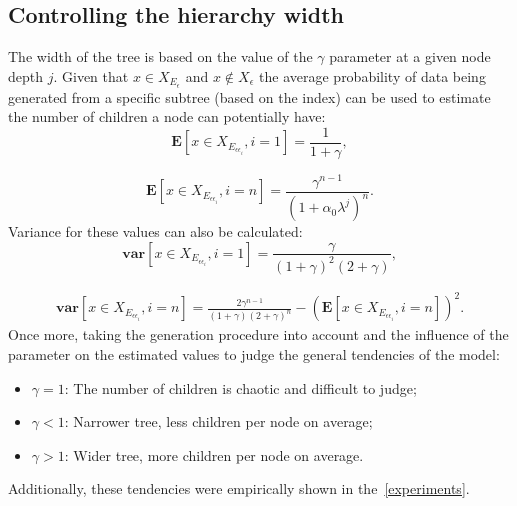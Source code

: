 \documentclass{article}
\begin{document}
    \subsection{Controlling the hierarchy width}
    The width of the tree is based on the value of the $\gamma$ parameter at a given node depth $j$. Given that 
    $x \in X_{E_\epsilon}$ and $x \not \in X_\epsilon$ the average probability of data being generated from a specific subtree (based on the index) can be used to estimate the number of children a node can potentially have:
    \begin{equation}
    \mathbf{E}[x \in X_{E_{\epsilon\epsilon_i}}, i = 1] = \frac{1}{1 + \gamma},
    \end{equation}
	
    \begin{equation}
    \mathbf{E}[x \in X_{E_{\epsilon\epsilon_i}}, i = n] = \frac{\gamma^{n-1}}{(1 + \alpha_0\lambda^j)^n}.
    \end{equation}
	Variance for these values can also be calculated:
    \begin{equation}
	\mathbf{var}[x \in X_{E_{\epsilon\epsilon_i}}, i = 1] = \frac{\gamma}{(1 + \gamma)^2(2 + \gamma)},
	\end{equation}
	
    \begin{equation}
	\begin{multlined}
	\mathbf{var}[x \in X_{E_{\epsilon\epsilon_i}}, i = n] = \frac{2 \gamma^{n-1}}{(1+\gamma)(2+\gamma)^n} - \left(\textbf{E}[x \in X_{E_{\epsilon\epsilon_i}}, i = n]\right)^2.
	\end{multlined}
	\end{equation}
	Once more, taking the generation procedure into account and the influence of the parameter on the estimated values to judge the general tendencies of the model:
	\begin{itemize}
		\item $\gamma = 1$: The number of children is chaotic and difficult to judge;
		\item $\gamma < 1$: Narrower tree, less children per node on average;
		\item $\gamma > 1$: Wider tree, more children per node on average.
	\end{itemize}
	Additionally, these tendencies were empirically shown in the~\cref{experiments}. 
\end{document}
